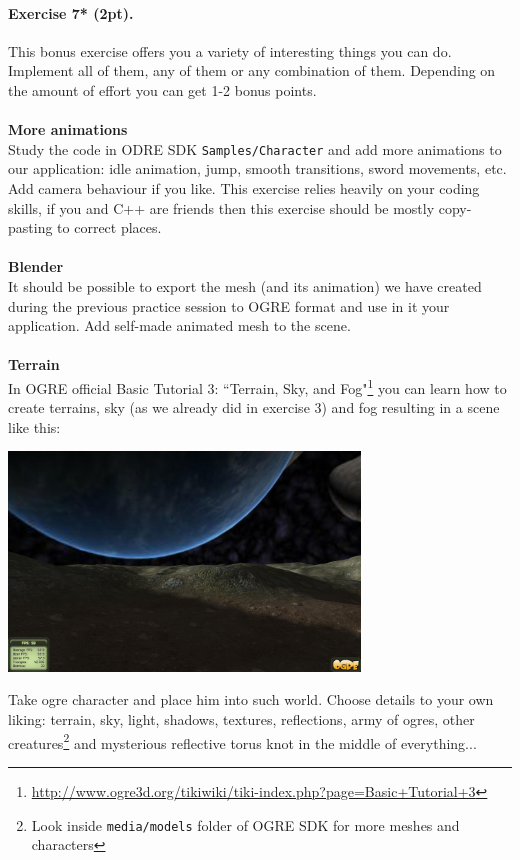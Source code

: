 \documentclass{article}
\newenvironment{exercise}[2]{\paragraph{Exercise #1 (#2pt).} }{
\medskip}
\begin{document}
\begin{exercise}{7*}{2}
This bonus exercise offers you a variety of interesting things you can do. Implement all of them, any of them or any combination of them. Depending on the amount of effort you can get 1-2 bonus points.
\ \\
\ \\
\textbf{More animations}\\
Study the code in ODRE SDK \verb#Samples/Character# and add more animations to our application: idle animation, jump, smooth transitions, sword movements, etc. Add camera behaviour if you like. This exercise relies heavily on your coding skills, if you and C++ are friends then this exercise should be mostly copy-pasting to correct places.
\ \\
\ \\
\textbf{Blender}\\
It should be possible to export the mesh (and its animation) we have created during the previous practice session to OGRE format and use in it your application. Add self-made animated mesh to the scene.
\ \\
\ \\
\textbf{Terrain}\\
In OGRE official Basic Tutorial 3: ``Terrain, Sky, and Fog"\footnote{\url{http://www.ogre3d.org/tikiwiki/tiki-index.php?page=Basic+Tutorial+3}} you can learn how to create terrains, sky (as we already did in exercise 3) and fog resulting in a scene like this:
\begin{center}
\includegraphics[width=0.7\textwidth]{terrain.jpg}
\end{center}
Take ogre character and place him into such world. Choose details to your own liking: terrain, sky, light, shadows, textures, reflections, army of ogres, other creatures\footnote{Look inside \texttt{media/models} folder of OGRE SDK for more meshes and characters} and mysterious reflective torus knot in the middle of everything...
\end{exercise}
\end{document}
